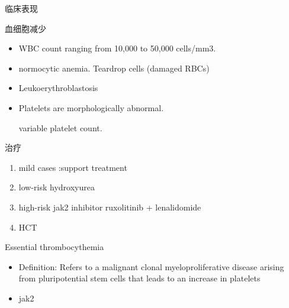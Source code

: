 \documentclass[
  ignorenonframetext,
]{beamer}
\begin{document}
\begin{frame}
\begin{block}{临床表现}
\protect\hypertarget{ux4e34ux5e8aux8868ux73b0-2}{}
\begin{block}{血细胞减少}
\protect\hypertarget{ux8840ux7ec6ux80deux51cfux5c11}{}
\begin{itemize}
\item
  WBC count ranging from 10,000 to 50,000 cells/mm3.
\item
  normocytic anemia. Teardrop cells (damaged RBCs)
\item
  Leukoerythroblastosis
\item
  Platelets are morphologically abnormal.

  variable platelet count.
\end{itemize}
\end{block}
\end{block}
\end{frame}

\begin{frame}
\begin{block}{治疗}
\protect\hypertarget{ux6cbbux7597-3}{}
\begin{enumerate}
\item
  mild cases :support treatment
\item
  low-risk hydroxyurea
\item
  high-risk jak2 inhibitor ruxolitinib + lenalidomide
\item
  HCT
\end{enumerate}
\end{block}
\end{frame}

\begin{frame}
\begin{block}{Essential thrombocythemia}
\protect\hypertarget{essential-thrombocythemia}{}
\begin{itemize}
\item
  Definition: Refers to a malignant clonal myeloproliferative disease
  arising from pluripotential stem cells that leads to an increase in
  platelets
\item
  jak2
\end{itemize}
\end{block}
\end{frame}
\end{document}
